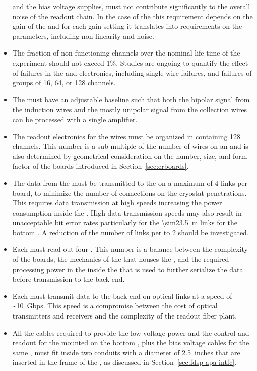 \begin{itemize}
{and the bias voltage supplies, must not contribute significantly to
the overall noise of the readout chain. In the case of the 
this requirement depends on the gain of the  and
for each gain setting it translates into requirements on
the  parameters, including non-linearity and noise.}
\item{The fraction of non-functioning channels over the \dunelifetime
nominal life time of the  experiment should not
exceed 1\%. Studies are ongoing to quantify the effect of failures
in the  and electronics, including
single wire failures, and failures of groups of
\num{16}, \num{64}, or \num{128} channels.}
\item{The  must have an adjustable baseline such that both the
bipolar signal from the induction wires and the mostly unipolar signal 
from the collection wires can be processed with a single amplifier.}
\item{The readout electronics for the  wires must be organized
in  containing 128 channels. This number is a sub-multiple
of the number of wires on an  and is also determined
by geometrical consideration on the number, size, and form
factor of the  boards introduced in Section~\ref{sec:crboards}.}
\item{The data from the  must be transmitted to the
 on a maximum of 4 links per board, to minimize
the number of connections on the cryostat penetrations. This 
requires data transmission at high speeds increasing the power
consumption inside the . High data transmission speeds may 
also result in unacceptable bit error rates particularly for the 
\SI{\sim23.5}{m} links for the bottom . A reduction of
the number of links per  to 2 should be investigated.}
\item{Each  must read-out four . This number
is a balance between the complexity of the boards, the mechanics
of the  that houses the , and the 
required processing power in the  inside the
 that is used to further serialize the data 
before transmission to the  back-end.}
\item{Each  must transmit data to the 
back-end on optical links at a speed of \SI{~10}{Gbps}. This speed 
is a compromise between the cost of optical transmitters and
receivers and the complexity of the readout fiber plant.}
\item{All the cables required to provide the low voltage power
and the control and readout for the  mounted on
the bottom , plus the bias voltage cables for
the same , must fit inside two conduits with a
diameter of \SI{2.5}{inches} that are inserted in the frame of
the , as discussed in Section~\ref{sec:fdsp-apa-intfc}.}
\end{itemize}

